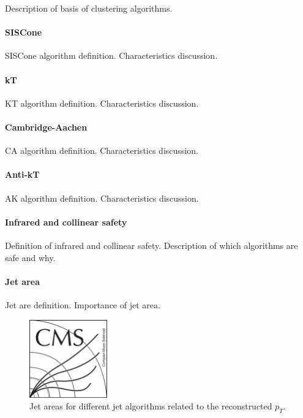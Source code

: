 Description of basis of clustering algorithms. 

\paragraph{SISCone}

SISCone algorithm definition. Characteristics discussion. 

\paragraph{kT}

KT algorithm definition. Characteristics discussion.

\paragraph{Cambridge-Aachen}

CA algorithm definition. Characteristics discussion.

\paragraph{Anti-kT}

AK algorithm definition. Characteristics discussion.

\paragraph{Infrared and collinear safety}

Definition of infrared and collinear safety. Description of which algorithms are safe and why.

\paragraph{Jet area}

Jet are definition. Importance of jet area.

\begin{figure}[!Hhtbp]
  \begin{center}
    \includegraphics[width=0.3\textwidth]{figs/CMSlogo.png}
    \caption{Jet areas for different jet algorithms related to the reconstructed $p_{T}$.}
    \label{fig:JetsAlgos}
  \end{center}
\end{figure}

